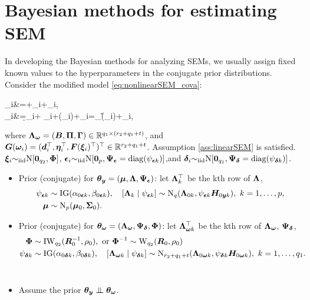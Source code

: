 \documentclass[10pt,a4paper]{book}
\begin{document}
\section{Bayesian methods for estimating SEM}\label{sec:Bayes_est_SEM}
In developing the Bayesian methods for analyzing SEMs, we usually assign fixed known values to the hyperparameters in the conjugate prior distributions.
Consider the modified model \eqref{eq:nonlinearSEM_cova}:
\begin{sequation*}
		\begin{aligned}
		\y_i&=\bam+\baL\bao_{i}+\bae_{i}, \\
		\bet_{i}&=\B\d_{i}+ \baP\bet_{i}+\baG\F(\bax_{i})+\bad_{i}=\baL_{\bao}\G(\bao_i)+\bad_i,
		\end{aligned}
\end{sequation*}
where $\baL_{\bao}=(\B,\baP,\baG)\in\bbR^{q_1\times (r_2+q_1+t)}$, and $\G(\bao_i)=(\d_i^\TT,\bet_i^\TT,\F(\bax_i)^\TT)^\TT\in\bbR^{r_2+q_1+t}$.    
Assumption \ref{ass:linearSEM} is satisfied. ${\bax}_i\simiid\rmN[\0_{q_2},\baF]$, $\bae_i\simiid\rmN[\0_p,\baY_\bae=\diag(\psi_{\bae k})]$,and $\bad_i\simiid\rmN[\0_{q_1},\baY_{\bad}=\diag(\psi_{\bad k})]$.
\begin{itemize}
	\item Prior (conjugate) for $\baq_\y=(\bam,\baL,\baY_{\bae})$: let $\baL_k^\TT$ be the kth row of $\baL$,
	\begin{equation*}
		\begin{aligned}
		\psi_{\bae k}&\sim\IG(\alpha_{0 \bae k}, \beta_{0 \bae k}), \quad [\baL_k\mid\psi_{\bae k}]\sim \rmN_q(\baL_{0k},\psi_{\bae k}\H_{0\y k}), \ k=1,\ldots,p,\\
		\bam&\sim\rmN_p(\bam_0,\baS_0).
		\end{aligned}
	\end{equation*}
	\item Prior (conjugate) for $\baq_\bao=(\baL_\bao,\baY_{\bad},\baF)$: let $\baL_{\bao k}^\TT$ be the kth row of $\baL_{\bao}$, $\baY_{\bad}$,
	\begin{equation*}
		\begin{aligned}
			\baF&\sim \IW_{q_2}(\R_0^{-1},\rho_0), \text{ or } \baF^{-1}\sim\mathrm{W}_{q_2}(\R_0,\rho_0)  \\
			\psi_{\bad k}&\sim \IG(\alpha_{0 \bad k},\beta_{0 \bad k}),\quad [\baL_{\bao k}\mid \psi_{\bad k}]\sim \rmN_{r_2+q_1+t}(\baL_{0\bao k},\psi_{\bad k}\H_{0\bao k}), \ k=1,\ldots,q_1.
		\end{aligned}
	\end{equation*} \
	\item Assume the prior $\baq_\y\indep\baq_\bao$. 
\end{itemize}
\end{document}
